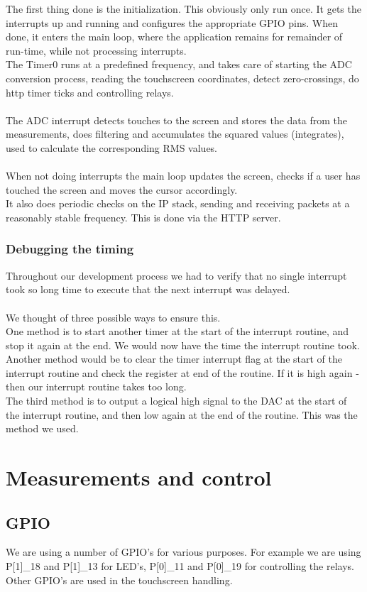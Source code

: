 The first thing done is the initialization. This obviously only run once. It gets the interrupts up and running and configures the appropriate GPIO pins. When done, it enters the main loop, where the application remains for remainder of run-time, while not processing interrupts.\\
The Timer0 runs at a predefined frequency, and takes care of starting the ADC conversion process, reading the touchscreen coordinates, detect zero-crossings, do http timer ticks and controlling relays.\\\\
The ADC interrupt detects touches to the screen and stores the data from the measurements, does filtering and accumulates the squared values (integrates), used to calculate the corresponding RMS values.\\\\
When not doing interrupts the main loop updates the screen, checks if a user has touched the screen and moves the cursor accordingly.\\
It also does periodic checks on the IP stack, sending and receiving packets at a reasonably stable frequency. This is done via the HTTP server.
\subsubsection{Debugging the timing}
Throughout our development process we had to verify that no single interrupt took so long time to execute that the next interrupt was delayed.\\\\
We thought of three possible ways to ensure this.\\
One method is to start another timer at the start of the interrupt routine, and stop it again at the end. We would now have the time the interrupt routine took.\\
Another method would be to clear the timer interrupt flag at the start of the interrupt routine and check the register at end of the routine. If it is high again - then our interrupt routine takes too long.\\
The third method is to output a logical high signal to the DAC at the start of the interrupt routine, and then low again at the end of the routine. This was the method we used.

\section{Measurements and control}
\subsection{GPIO}
We are using a number of GPIO's for various purposes. For example we are using P[1]\_18 and P[1]\_13 for LED's, P[0]\_11 and P[0]\_19 for controlling the relays. Other GPIO's are used in the touchscreen handling.

